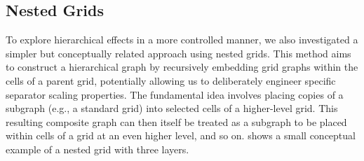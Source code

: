 \subsection{Nested Grids}

To explore hierarchical effects in a more controlled manner, we also investigated a simpler but conceptually related approach using nested grids.
This method aims to construct a hierarchical graph by recursively embedding grid graphs within the cells of a parent grid, potentially allowing us to deliberately engineer specific separator scaling properties.
The fundamental idea involves placing copies of a subgraph (e.g., a standard grid) into selected cells of a higher-level grid.
This resulting composite graph can then itself be treated as a subgraph to be placed within cells of a grid at an even higher level, and so on.
 shows a small conceptual example of a nested grid with three layers.

